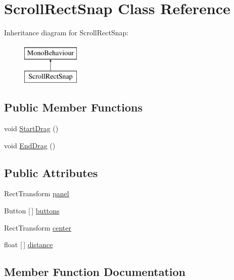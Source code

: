 \hypertarget{classScrollRectSnap}{}\section{Scroll\+Rect\+Snap Class Reference}
\label{classScrollRectSnap}
Inheritance diagram for Scroll\+Rect\+Snap\+:\begin{figure}[H]
\begin{center}
\leavevmode
\includegraphics[height=2.000000cm]{classScrollRectSnap}
\end{center}
\end{figure}
\subsection*{Public Member Functions}
\begin{DoxyCompactItemize}
\item 
void \hyperlink{classScrollRectSnap_ac30957c07a9f81edc4acafdb65600d27}{Start\+Drag} ()
\item 
void \hyperlink{classScrollRectSnap_aa3fbbad35f3f144e2ce508ab06a781ce}{End\+Drag} ()
\end{DoxyCompactItemize}
\subsection*{Public Attributes}
\begin{DoxyCompactItemize}
\item 
Rect\+Transform \hyperlink{classScrollRectSnap_a79161928f3a343aa90dd4d552bf7a7d7}{panel}
\item 
Button \mbox{[}$\,$\mbox{]} \hyperlink{classScrollRectSnap_abe4149dd4a42500fbdd321b2c4471322}{buttons}
\item 
Rect\+Transform \hyperlink{classScrollRectSnap_a0af76cd3bbe9c69b6482fedfd04e6f5a}{center}
\item 
float \mbox{[}$\,$\mbox{]} \hyperlink{classScrollRectSnap_a6956e26eab23ba0e943fc31ebfc48b9e}{distance}
\end{DoxyCompactItemize}


\subsection{Member Function Documentation}
\mbox{\label{classScrollRectSnap_aa3fbbad35f3f144e2ce508ab06a781ce}} 
